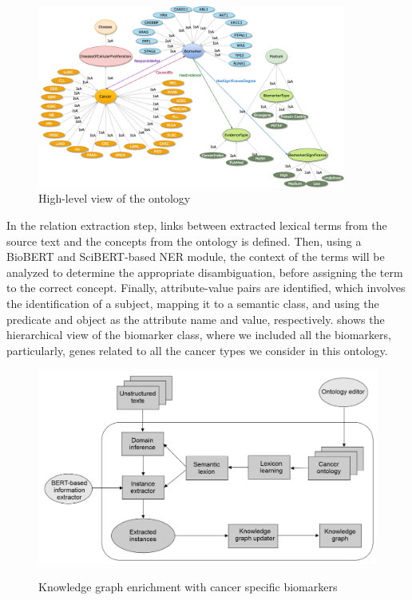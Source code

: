 \begin{figure}
	\centering
	\includegraphics[width=0.8\linewidth,height=60mm]{images/diagram_general_view.png}
	\caption{High-level view of the ontology} 
	\label{fig:main_ontology}
\end{figure}

\hspace*{3.5mm} In the relation extraction step, links between extracted lexical terms from the source text and the concepts from the ontology is defined. Then, using a BioBERT and SciBERT-based NER module, the context of the terms will be analyzed to determine the appropriate disambiguation, before assigning the term to the correct concept. Finally, attribute-value pairs are identified, which involves the identification of a subject, mapping it to a semantic class, and using the predicate and object as the attribute name and value, respectively.  shows the hierarchical view of the biomarker class, where we included all the biomarkers, particularly, genes related to all the cancer types we consider in this ontology. 

\begin{figure}[h]
	\centering
		\includegraphics[scale=0.65]{images/KG_enrichment.png}
        \label{fig:kg_enrichment}
	\caption{Knowledge graph enrichment with cancer specific biomarkers}
	\vspace{-2mm}
\end{figure}


